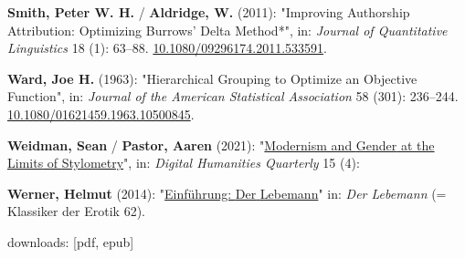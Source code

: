 \documentclass[
  12pt,
  letterpaper,
]{classicthesis}
\newlength{\cslhangindent}
\newenvironment{CSLReferences}[2] %
 {\begin{list}{}{%
  \setlength{\itemindent}{0pt}
  \setlength{\leftmargin}{0pt}
  \setlength{\parsep}{0pt}
  \ifodd #1
   \setlength{\leftmargin}{\cslhangindent}
   \setlength{\itemindent}{-1\cslhangindent}
  \fi
  \setlength{\itemsep}{#2\baselineskip}}}
 {\end{list}}
\begin{document}
\begin{CSLReferences}{1}{0}
\textbf{Smith, Peter W. H.} / \textbf{Aldridge, W.} (2011): "Improving
{Authorship} {Attribution}: {Optimizing} {Burrows}' {Delta} {Method}*",
in: \emph{Journal of Quantitative Linguistics} 18 (1): 63--88.
\href{https://doi.org/10.1080/09296174.2011.533591}{10.1080/09296174.2011.533591}.

\textbf{Ward, Joe H.} (1963): "Hierarchical {Grouping} to {Optimize} an
{Objective} {Function}", in: \emph{Journal of the American Statistical
Association} 58 (301): 236--244.
\href{https://doi.org/10.1080/01621459.1963.10500845}{10.1080/01621459.1963.10500845}.

\textbf{Weidman, Sean} / \textbf{Pastor, Aaren} (2021):
"\href{https://www.digitalhumanities.org/dhq/vol/15/4/000566/000566.html}{Modernism
and {Gender} at the {Limits} of {Stylometry}}", in: \emph{Digital
Humanities Quarterly} 15 (4):

\textbf{Werner, Helmut} (2014):
"\href{https://seyerlein.de/shop/item/9783944964744/klassiker-der-erotik-62-der-lebemann-von-andrea-de-nerciat-e-book-epub}{Einführung:
{Der} {Lebemann}}" in: \emph{Der {Lebemann}} (= Klassiker der {Erotik}
62).

\end{CSLReferences}



\printindex

downloads: [pdf, epub]
\end{document}
